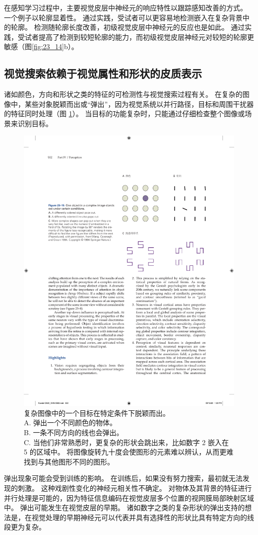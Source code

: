 在感知学习过程中，主要视觉皮层中神经元的响应特性以跟踪感知改善的方式。
一个例子以轮廓显着性。
通过实践，受试者可以更容易地检测嵌入在复杂背景中的轮廓。
检测随轮廓长度改善，初级视觉皮层中神经元的反应也是如此。
通过实践，受试者提高了检测到较短轮廓的能力，而初级视觉皮层神经元对较短的轮廓更敏感（图\ref{fig:23_14}b）。



\subsection{视觉搜索依赖于视觉属性和形状的皮质表示}

诸如颜色，方向和形状之类的特征的可检测性与视觉搜索过程有关。
在复杂的图像中，某些对象脱颖而出或“弹出”，因为视觉系统以并行路径，目标和周围干扰器的特征同时处理（图 \ref{fig:23_15}）。 
当目标的功能复杂时，只能通过仔细检查整个图像或场景来识别目标。

\begin{figure}[htbp]
	\centering
	\includegraphics[width=0.6\linewidth]{chap23/fig_23_15}
	\caption{复杂图像中的一个目标在特定条件下脱颖而出。\protect\\
		A. 弹出一个不同颜色的物体。\protect\\
		B. 一条不同方向的线也会弹出。\protect\\
		C. 当他们非常熟悉时，更复杂的形状会跳出来，比如数字 2 嵌入在 5 的区域中。
		将图像旋转九十度会使图形的元素难以辨认，从而更难找到与其他图形不同的图形\cite{wang1994familiarity}。}
	\label{fig:23_15}
\end{figure}


弹出现象可能会受到训练的影响。
在训练后，如果没有努力搜索，最初就无法发现的刺激。 
这种戏剧性变化的神经元相关性不确定。
对物体及其背景的特征进行并行处理是可能的，因为特征信息编码在视觉皮层多个位置的视网膜局部映射区域中。
弹出可能发生在视觉皮层的早期。
诸如数字之类的复杂形状的弹出支持的想法是，在视觉处理的早期神经元可以代表并具有选择性的形状比具有特定方向的线段更为复杂。



